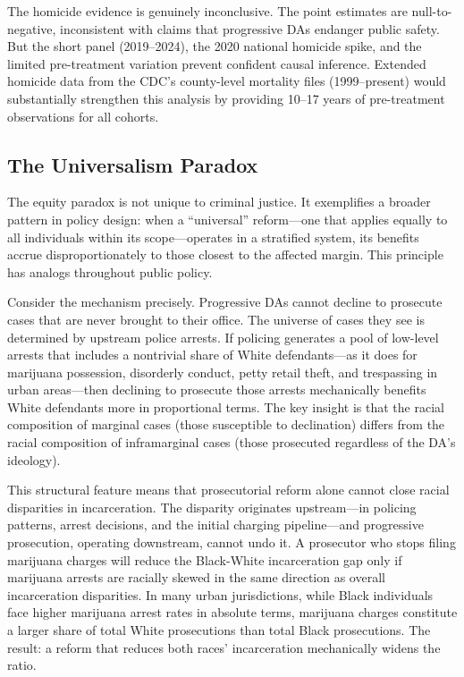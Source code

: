 \documentclass[12pt]{article}
\begin{document}
The homicide evidence is genuinely inconclusive. The point estimates are null-to-negative, inconsistent with claims that progressive DAs endanger public safety. But the short panel (2019--2024), the 2020 national homicide spike, and the limited pre-treatment variation prevent confident causal inference. Extended homicide data from the CDC's county-level mortality files (1999--present) would substantially strengthen this analysis by providing 10--17 years of pre-treatment observations for all cohorts.

\subsection{The Universalism Paradox}

The equity paradox is not unique to criminal justice. It exemplifies a broader pattern in policy design: when a ``universal'' reform---one that applies equally to all individuals within its scope---operates in a stratified system, its benefits accrue disproportionately to those closest to the affected margin. This principle has analogs throughout public policy.

Consider the mechanism precisely. Progressive DAs cannot decline to prosecute cases that are never brought to their office. The universe of cases they see is determined by upstream police arrests. If policing generates a pool of low-level arrests that includes a nontrivial share of White defendants---as it does for marijuana possession, disorderly conduct, petty retail theft, and trespassing in urban areas---then declining to prosecute those arrests mechanically benefits White defendants more in proportional terms. The key insight is that the racial composition of marginal cases (those susceptible to declination) differs from the racial composition of inframarginal cases (those prosecuted regardless of the DA's ideology).

This structural feature means that prosecutorial reform alone cannot close racial disparities in incarceration. The disparity originates upstream---in policing patterns, arrest decisions, and the initial charging pipeline---and progressive prosecution, operating downstream, cannot undo it. A prosecutor who stops filing marijuana charges will reduce the Black-White incarceration gap only if marijuana arrests are racially skewed in the same direction as overall incarceration disparities. In many urban jurisdictions, while Black individuals face higher marijuana arrest rates in absolute terms, marijuana charges constitute a larger share of total White prosecutions than total Black prosecutions. The result: a reform that reduces both races' incarceration mechanically widens the ratio.
\end{document}
